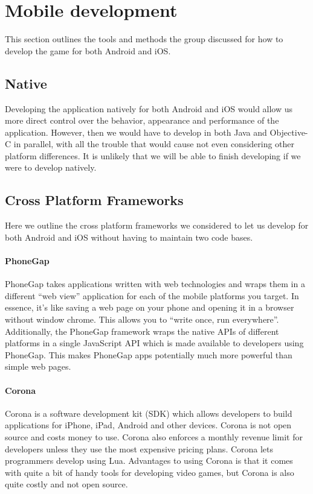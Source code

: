 \section{Mobile development}

This section outlines the tools and methods the group discussed for how to
develop the game for both Android and iOS.

\subsection{Native}

Developing the application natively for both Android and iOS would allow us more
direct control over the behavior, appearance and performance of the application.
However, then we would have to develop in both Java and Objective-C in parallel,
with all the trouble that would cause not even considering other platform
differences. It is unlikely that we will be able to finish developing if we were
to develop natively.

\subsection{Cross Platform Frameworks}

Here we outline the cross platform frameworks we considered to let us develop for
both Android and iOS without having to maintain two code bases.

\paragraph{PhoneGap}
PhoneGap takes applications written with web technologies and wraps them in
a different ``web view'' application for each of the mobile platforms you
target. In essence, it's like saving a web page on your phone and opening
it in a browser without window chrome. This allows you to ``write once, run
everywhere''. Additionally, the PhoneGap framework wraps the native APIs of
different platforms in a single JavaScript API which is made available to
developers using PhoneGap. This makes PhoneGap apps potentially much more
powerful than simple web pages. \cite{phonegapAbout}

\paragraph{Corona}

Corona is a software development kit (SDK) which allows developers to build
applications for iPhone, iPad, Android and other devices. Corona is not open
source and costs money to use. Corona also enforces a monthly revenue limit for
developers unless they use the most expensive pricing plans\cite{coronaPrice}.
Corona lets programmers develop using Lua.\cite{coronaSDK} Advantages to using
Corona is that it comes with quite a bit of handy tools for developing video
games, but Corona is also quite costly and not open source.


